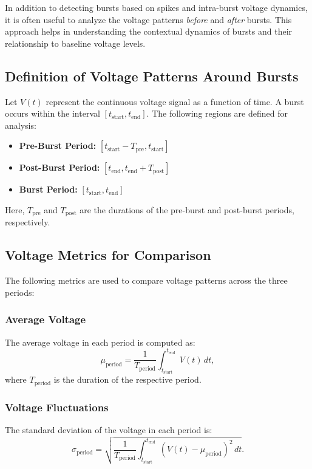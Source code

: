 \documentclass[a4paper,9pt]{extarticle}
\begin{document}
In addition to detecting bursts based on spikes and intra-burst voltage dynamics, it is often useful to analyze the voltage patterns \emph{before} and \emph{after} bursts. This approach helps in understanding the contextual dynamics of bursts and their relationship to baseline voltage levels.

\subsection{Definition of Voltage Patterns Around Bursts}
Let $V(t)$ represent the continuous voltage signal as a function of time. A burst occurs within the interval $[t_{\text{start}}, t_{\text{end}}]$. The following regions are defined for analysis:
\begin{itemize}
    \item \textbf{Pre-Burst Period:} $[t_{\text{start}} - T_{\text{pre}}, t_{\text{start}}]$
    \item \textbf{Post-Burst Period:} $[t_{\text{end}}, t_{\text{end}} + T_{\text{post}}]$
    \item \textbf{Burst Period:} $[t_{\text{start}}, t_{\text{end}}]$
\end{itemize}
Here, $T_{\text{pre}}$ and $T_{\text{post}}$ are the durations of the pre-burst and post-burst periods, respectively.

\subsection{Voltage Metrics for Comparison}
The following metrics are used to compare voltage patterns across the three periods:

\subsubsection{Average Voltage}
The average voltage in each period is computed as:
\[
\mu_{\text{period}} = \frac{1}{T_{\text{period}}} \int_{t_{\text{start}}}^{t_{\text{end}}} V(t) \, dt,
\]
where $T_{\text{period}}$ is the duration of the respective period.

\subsubsection{Voltage Fluctuations}
The standard deviation of the voltage in each period is:
\[
\sigma_{\text{period}} = \sqrt{\frac{1}{T_{\text{period}}} \int_{t_{\text{start}}}^{t_{\text{end}}} \left(V(t) - \mu_{\text{period}}\right)^2 \, dt}.
\]
\end{document}
